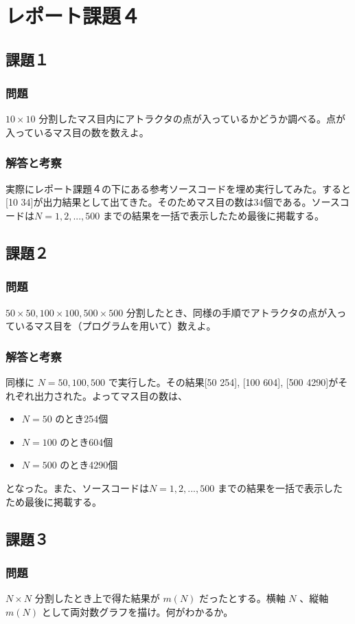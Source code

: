 \section{レポート課題４}
\subsection{課題１}
\subsubsection{問題}
$10 \times 10$ 分割したマス目内にアトラクタの点が入っているかどうか調べる。点が入っているマス目の数を数えよ。
\subsubsection{解答と考察}
実際にレポート課題４の下にある参考ソースコードを埋め実行してみた。すると[10 34]が出力結果として出てきた。そのためマス目の数は34個である。ソースコードは$N = 1, 2, ..., 500$ までの結果を一括で表示したため最後に掲載する。

\subsection{課題２}
\subsubsection{問題}
$50 \times 50, 100 \times 100, 500 \times 500$ 分割したとき、同様の手順でアトラクタの点が入っているマス目を（プログラムを用いて）数えよ。
\subsubsection{解答と考察}
同様に $N = 50, 100, 500$ で実行した。その結果[50 254], [100 604], [500 4290]がそれぞれ出力された。よってマス目の数は、
\begin{itemize}
  \item $N = 50$ のとき254個
  \item $N = 100$ のとき604個
  \item $N = 500$ のとき4290個
\end{itemize}
となった。また、ソースコードは$N = 1, 2, ..., 500$ までの結果を一括で表示したため最後に掲載する。

\newpage
\subsection{課題３}
\subsubsection{問題}
$N \times N$ 分割したとき上で得た結果が $m \left( N \right)$ だったとする。横軸 $N$ 、縦軸 $m \left( N \right)$ として両対数グラフを描け。何がわかるか。
